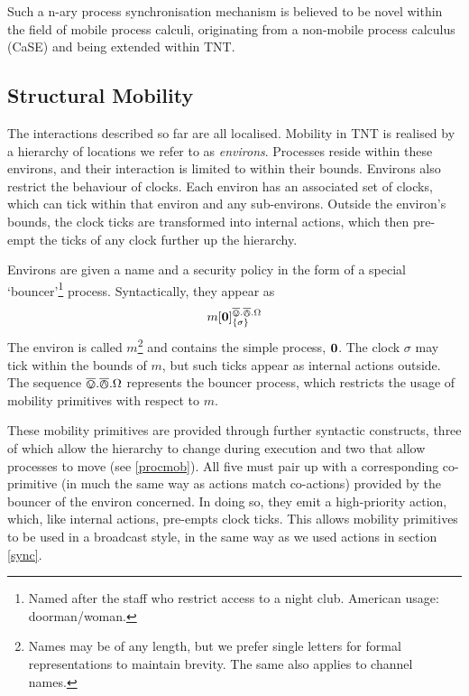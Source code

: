 \documentclass{acm_proc_article-sp}
\begin{document}
Such a n-ary process synchronisation mechanism is believed to be novel
within the field of mobile process calculi, originating from a
non-mobile process calculus (CaSE) and being extended within TNT.

\subsection{Structural Mobility}
\label{structmob}

The interactions described so far are all localised.  Mobility in TNT is
realised by a hierarchy of locations we refer to as \emph{environs}.
Processes reside within these environs, and their interaction is limited
to within their bounds.  Environs also restrict the behaviour of clocks.
Each environ has an associated set of clocks, which can tick within that
environ and any sub-environs.  Outside the environ's bounds, the clock
ticks are transformed into internal actions, which then pre-empt the
ticks of any clock further up the hierarchy.

Environs are given a name and a security policy in the form of a special
`bouncer'\footnote{Named after the staff who restrict access to a night
club.  American usage: doorman/woman.} process.  Syntactically, they
appear as
\begin{displaymath}
{m}[ \textbf{0} ]^{\overline{\varovee}.\overline{\varowedge}.\Omega}_{\{\sigma\}}
\end{displaymath}
The environ is called $m$\footnote{Names may be of any length, but we
 prefer single letters for formal representations to maintain brevity.
 The same also applies to channel names.} and contains the simple
 process, $\textbf{0}$.  The clock $\sigma$ may tick within the bounds of $m$,
 but such ticks appear as internal actions outside.  The sequence
 $\overline{\varovee}.\overline{\varowedge}.\Omega$ represents the bouncer process, which restricts the
 usage of mobility primitives with respect to $m$.

These mobility primitives are provided through further syntactic
 constructs, three of which allow the hierarchy to change during
 execution and two that allow processes to move (see \ref{procmob}).
 All five must pair up with a corresponding co-primitive (in much the
 same way as actions match co-actions) provided by the bouncer of the
 environ concerned.  In doing so, they emit a high-priority action,
 which, like internal actions, pre-empts clock ticks.  This allows
 mobility primitives to be used in a broadcast style, in the same way as
 we used actions in section \ref{sync}.
\end{document}
